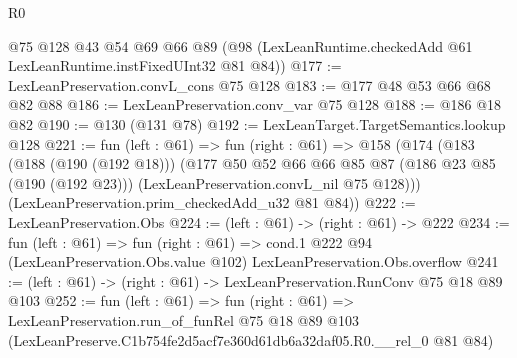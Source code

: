 \begin{lexlean}{R0}
\begin{coremodule}
    @75
    @128
    @43
    @54
    @69
    @66
    @89
    (@98 (LexLeanRuntime.checkedAdd @61 LexLeanRuntime.instFixedUInt32 @81 @84))
@177 := LexLeanPreservation.convL_cons @75 @128
@183 := @177 @48 @53 @66 @68 @82 @88
@186 := LexLeanPreservation.conv_var @75 @128
@188 := @186 @18 @82
@190 := @130 (@131 @78)
@192 := LexLeanTarget.TargetSemantics.lookup @128
@221 := fun (left : @61) =>
  fun (right : @61) =>
  @158
    (@174
      (@183
        (@188 (@190 (@192 @18)))
        (@177
          @50
          @52
          @66
          @66
          @85
          @87
          (@186 @23 @85 (@190 (@192 @23)))
          (LexLeanPreservation.convL_nil @75 @128)))
      (LexLeanPreservation.prim_checkedAdd_u32 @81 @84))
@222 := LexLeanPreservation.Obs
@224 := (left : @61) -> (right : @61) -> @222
@234 := fun (left : @61) =>
  fun (right : @61) =>
  cond.{1} @222 @94 (LexLeanPreservation.Obs.value @102) LexLeanPreservation.Obs.overflow
@241 := (left : @61) -> (right : @61) -> LexLeanPreservation.RunConv @75 @18 @89 @103
@252 := fun (left : @61) =>
  fun (right : @61) =>
  LexLeanPreservation.run_of_funRel
    @75
    @18
    @89
    @103
    (LexLeanPreserve.C1b754fe2d5acf7e360d61db6a32daf05.R0.__rel_0 @81 @84)
\end{coremodule}
\end{lexlean}
